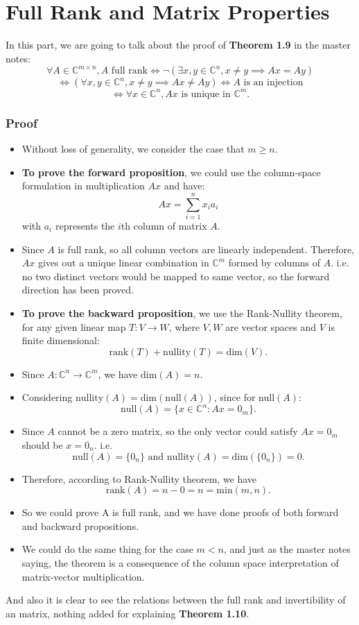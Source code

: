 \section{Full Rank and Matrix Properties}%
In this part, we are going to talk about the proof of  \textbf{Theorem 1.9} in the master notes:
\[
  \forall A \in \mathbb{C}^{m \times n}, A \text{ full rank} \iff \neg (\exists x, y \in \mathbb{C}^{n}, x \neq  y \implies Ax = Ay)
\]
\[
  \iff (\forall x, y \in \mathbb{C}^{n}, x \neq y \implies Ax \neq Ay) \iff A \text{ is an injection}
\]
\[
\iff \forall x \in \mathbb{C}^{n}, Ax \text{ is unique in }\mathbb{C}^{m}
.\] 
\subsubsection*{Proof}
\begin{itemize}
  \item Without loss of generality, we consider the case that $m \ge  n$.
  \item \textbf{To prove the forward proposition}, we could use the column-space formulation in multiplication $Ax$ and have:
     \[
    Ax = \sum_{i=1}^{n} x_i a_i
    \]
    with $a_i$ represents the  $i$th column of matrix $A$.
  \item Since $A$ is full rank, so all column vectors are linearly independent. Therefore, $Ax$ gives out a unique linear combination in  $\mathbb{C}^{m}$ formed by columns of $A$. i.e. no two distinct vectors would be mapped to same vector, so the forward direction has been proved.
  \item \textbf{To prove the backward proposition}, we use the Rank-Nullity theorem, for any given linear map $T: V \to  W$, where $V, W$ are vector spaces and  $V$ is finite dimensional:
    \[
      \text{rank}(T) + \text{nullity}(T) = \text{dim}(V)
    .\]
  \item Since $A : \mathbb{C}^{n} \to  \mathbb{C}^{m}$, we have $\text{dim}(A) = n$.
  \item Considering $\text{nullity}(A) = \text{dim}(\text{null}(A))$, since for null$(A)$:
    \[
      \text{null}(A) = \{x \in \mathbb{C}^{n}: Ax = 0_m\} 
    .\]
  \item Since $A$ cannot be a zero matrix, so the only vector could satisfy $Ax = 0_m$ should be  $x = 0_n$. i.e. 
    \[
      \text{null}(A) = \{0_n\} \text{ and nullity}(A) = \text{dim}(\{0_n\}) = 0
    .\]
  \item Therefore, according to Rank-Nullity theorem, we have 
    \[
      \text{rank}(A) = n - 0 = n = \text{min}(m, n)
    .\]
  \item So we could prove A is full rank, and we have done proofs of both forward and backward propositions.
  \item We could do the same thing for the case $m < n$, and just as the master notes saying, the theorem is a consequence of the column space interpretation of matrix-vector multiplication.

\end{itemize}
And also it is clear to see the relations between the full rank and invertibility of an matrix, nothing added for explaining \textbf{Theorem 1.10}.
